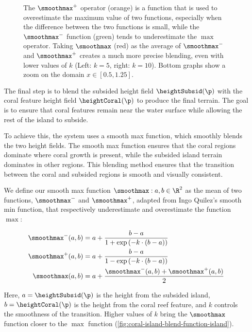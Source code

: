 \begin{figure}[H]
\caption{The $\smoothmax^+$ operator (orange) is a function that is used to overestimate the maximum value of two functions, especially when the difference between the two functions is small, while the $\smoothmax^-$ function (green) tends to underestimate the $\max$ operator. Taking $\smoothmax$ (red) as the average of $\smoothmax^-$ and $\smoothmax^+$ creates a much more precise blending, even with lower values of $k$ (Left: $k=5$, right: $k=10$). Bottom graphs show a zoom on the domain $x \in [0.5, 1.25]$.}
\label{fig:coral-island-blend-function-island-with-upper}
\end{figure}

The final step is to blend the subsided height field $\heightSubsid(\p)$ with the coral feature height field $\heightCoral(\p)$ to produce the final terrain. The goal is to ensure that coral features remain near the water surface while allowing the rest of the island to subside.

To achieve this, the system uses a smooth max function, which smoothly blends the two height fields. The smooth max function ensures that the coral regions dominate where coral growth is present, while the subsided island terrain dominates in other regions. This blending method ensures that the transition between the coral and subsided regions is smooth and visually consistent.

We define our smooth max function $\smoothmax: a, b \in \R^2$ as the mean of two functions, $\smoothmax^-$ and $\smoothmax^+$, adapted from Ingo Quilez's smooth min function, that respectively underestimate and overestimate the function $\max$:

\begin{align}
\smoothmax^-(a, b) &= a + \frac{b - a}{1 + \exp\left(-k \cdot (b - a) \right)} \\
\smoothmax^+(a, b) &= a + \frac{b - a}{1 - \exp\left(-k \cdot (b - a) \right)} \\
\smoothmax(a, b) &= a + \frac{\smoothmax^-(a, b) + \smoothmax^+(a, b)}{2}
\end{align}

Here, $a = \heightSubsid(\p)$ is the height from the subsided island, $b = \heightCoral(\p)$ is the height from the coral reef feature, and $k$ controls the smoothness of the transition. Higher values of $k$ bring the $\smoothmax$ function closer to the $\max$ function (\cref{fig:coral-island-blend-function-island}).

